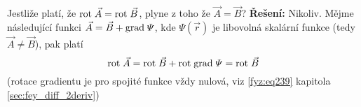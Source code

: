 \begin{example}
  Jestliže platí, že \(\mathrm{rot}\;\vec{A} = \mathrm{rot}\;\vec{B}\), plyne z toho že \(\vec{A}=\vec{B}\)?\newline  
  \textbf{Řešení:} 
  Nikoliv. Mějme následující funkci \(\vec{A} = \vec{B} + \mathrm{grad\;}\varPsi\), kde 
  \(\varPsi(\vec{r})\) je libovolná skalární funkce (tedy \(\vec{A}\neq\vec{B}\)), pak platí
  \[\mathrm{rot}\;\vec{A} = \mathrm{rot}\;\vec{B} +\mathrm{rot}\;\mathrm{grad\;}\varPsi = \mathrm{rot}\;\vec{B}\] (rotace gradientu je pro 
  spojité funkce vždy nulová, viz \ref{fyz:eq239} kapitola \ref{sec:fey_diff_2deriv})
\end{example}